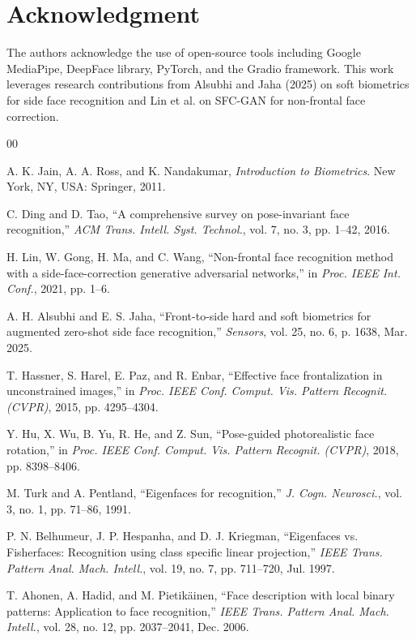 \documentclass[conference]{IEEEtran}
\begin{document}
\section*{Acknowledgment}

The authors acknowledge the use of open-source tools including Google MediaPipe, DeepFace library, PyTorch, and the Gradio framework. This work leverages research contributions from Alsubhi and Jaha (2025) on soft biometrics for side face recognition and Lin et al. on SFC-GAN for non-frontal face correction.

\begin{thebibliography}{00}

 A. K. Jain, A. A. Ross, and K. Nandakumar, \textit{Introduction to Biometrics}. New York, NY, USA: Springer, 2011.

 C. Ding and D. Tao, ``A comprehensive survey on pose-invariant face recognition,'' \textit{ACM Trans. Intell. Syst. Technol.}, vol. 7, no. 3, pp. 1--42, 2016.

 H. Lin, W. Gong, H. Ma, and C. Wang, ``Non-frontal face recognition method with a side-face-correction generative adversarial networks,'' in \textit{Proc. IEEE Int. Conf.}, 2021, pp. 1--6.

 A. H. Alsubhi and E. S. Jaha, ``Front-to-side hard and soft biometrics for augmented zero-shot side face recognition,'' \textit{Sensors}, vol. 25, no. 6, p. 1638, Mar. 2025.

 T. Hassner, S. Harel, E. Paz, and R. Enbar, ``Effective face frontalization in unconstrained images,'' in \textit{Proc. IEEE Conf. Comput. Vis. Pattern Recognit. (CVPR)}, 2015, pp. 4295--4304.

 Y. Hu, X. Wu, B. Yu, R. He, and Z. Sun, ``Pose-guided photorealistic face rotation,'' in \textit{Proc. IEEE Conf. Comput. Vis. Pattern Recognit. (CVPR)}, 2018, pp. 8398--8406.

 M. Turk and A. Pentland, ``Eigenfaces for recognition,'' \textit{J. Cogn. Neurosci.}, vol. 3, no. 1, pp. 71--86, 1991.

 P. N. Belhumeur, J. P. Hespanha, and D. J. Kriegman, ``Eigenfaces vs. Fisherfaces: Recognition using class specific linear projection,'' \textit{IEEE Trans. Pattern Anal. Mach. Intell.}, vol. 19, no. 7, pp. 711--720, Jul. 1997.

 T. Ahonen, A. Hadid, and M. Pietik\"{a}inen, ``Face description with local binary patterns: Application to face recognition,'' \textit{IEEE Trans. Pattern Anal. Mach. Intell.}, vol. 28, no. 12, pp. 2037--2041, Dec. 2006.


\end{thebibliography}
\end{document}

